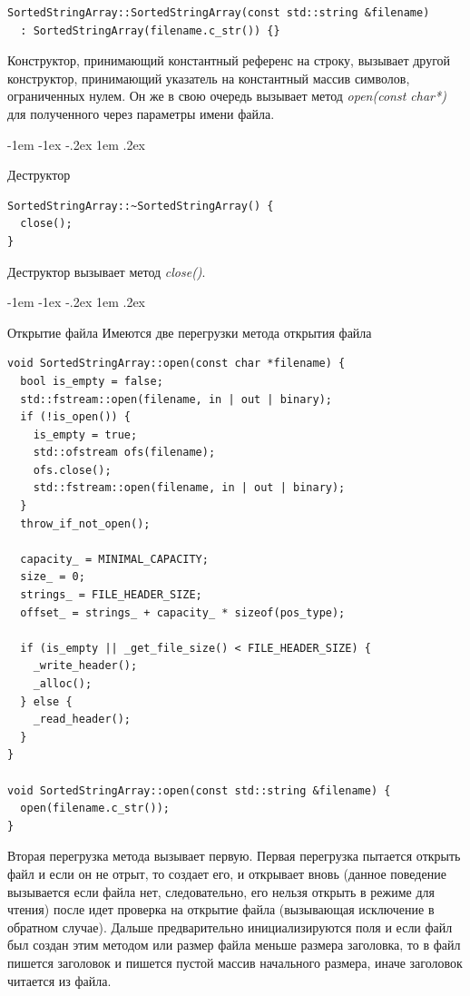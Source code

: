 \documentclass[a4paper,14pt,oneside,final]{extreport}
\makeatletter
\newlength{\fivecharsapprox}
\renewcommand\subsection{%
  \@startsection{subsection}{2}%
    {\fivecharsapprox}%
    {-1em \@plus -1ex \@minus -.2ex}%
    {1em \@plus .2ex}%
    {\raggedright\hyphenpenalty=10000\normalfont\normalsize\bfseries}}
\makeatother
\begin{document}
\begin{verbatim}
SortedStringArray::SortedStringArray(const std::string &filename)
  : SortedStringArray(filename.c_str()) {}
\end{verbatim}

Конструктор, принимающий константный референс на строку, вызывает другой конструктор, принимающий указатель на константный массив символов, ограниченных нулем. Он же в свою очередь вызывает метод \textit{open(const char*)} для полученного через параметры имени файла.

\subsection{Деструктор}
\begin{verbatim}
SortedStringArray::~SortedStringArray() {
  close();
}
\end{verbatim}

Деструктор вызывает метод \textit{close()}.

\subsection{Открытие файла}
Имеются две перегрузки метода открытия файла
\begin{verbatim}
void SortedStringArray::open(const char *filename) {
  bool is_empty = false;
  std::fstream::open(filename, in | out | binary);
  if (!is_open()) {
    is_empty = true;
    std::ofstream ofs(filename);
    ofs.close();
    std::fstream::open(filename, in | out | binary);
  }
  throw_if_not_open();

  capacity_ = MINIMAL_CAPACITY;
  size_ = 0;
  strings_ = FILE_HEADER_SIZE;
  offset_ = strings_ + capacity_ * sizeof(pos_type);

  if (is_empty || _get_file_size() < FILE_HEADER_SIZE) {
    _write_header();
    _alloc();
  } else {
    _read_header();
  }
}

void SortedStringArray::open(const std::string &filename) {
  open(filename.c_str());
}
\end{verbatim}

Вторая перегрузка метода вызывает первую. Первая перегрузка пытается открыть файл и если он не отрыт, то создает его, и открывает вновь (данное поведение вызывается если файла нет, следовательно, его нельзя открыть в режиме для чтения) после идет проверка на открытие файла (вызывающая исключение в обратном случае).
Дальше предварительно инициализируются поля и если файл был создан этим методом или размер файла меньше размера заголовка, то в файл пишется заголовок и пишется пустой массив начального размера, иначе заголовок читается из файла.
\end{document}
